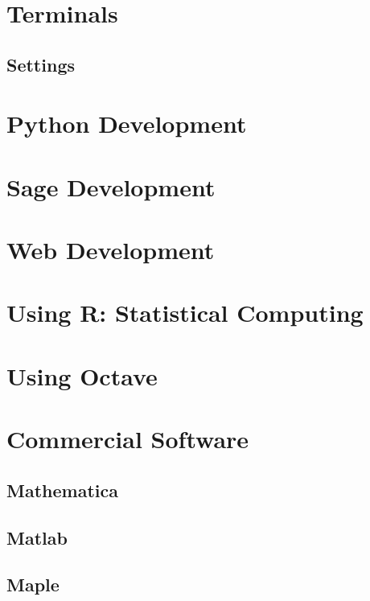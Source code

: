\documentclass{article}
\begin{document}
\section{Terminals}\label{sec:terminal}

\subsection{Settings}

\section{Python Development}\label{sec:sagedev}

\section{Sage Development}\label{sec:sagedev}

\section{Web Development}\label{sec:webdev}

\section{Using R: Statistical Computing}\label{sec:r}

\section{Using Octave}\label{sec:octave}

\section{Commercial Software}

\subsection{Mathematica}\label{sec:mathematica}

\subsection{Matlab}\label{sec:matlab}

\subsection{Maple}\label{sec:maple}
\end{document}
